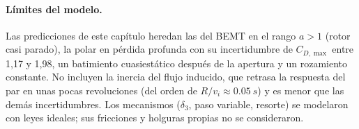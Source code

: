 \paragraph{Límites del modelo.} Las predicciones de este capítulo heredan las del BEMT en el
rango $a>1$ (rotor casi parado), la polar en pérdida profunda con su incertidumbre de
$C_{D,\max}$ entre 1,17 y 1,98, un batimiento cuasiestático después de la apertura y un
rozamiento constante. No incluyen la inercia del flujo inducido, que retrasa la respuesta
del par en unas pocas revoluciones (del orden de $R/v_i\approx\SI{0.05}{s}$) y es menor que
las demás incertidumbres. Los mecanismos ($\delta_3$, paso variable, resorte) se modelaron con
leyes ideales; sus fricciones y holguras propias no se consideraron.
